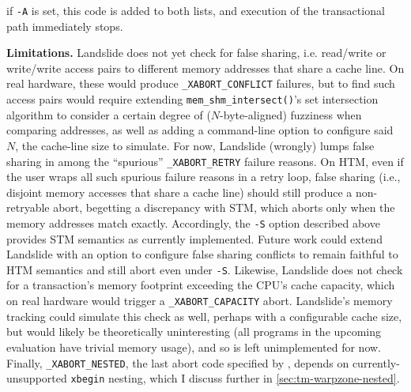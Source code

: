 \begin{itemize}
		if {\tt -A} is set,
		this code is added to both lists,
		and execution of the transactional path immediately stops.
\end{itemize}

{\bf Limitations.}
Landslide does not yet check for false sharing,
i.e. read/write or write/\allowbreak{}write access pairs to different memory addresses that share a cache line.
On real hardware, these would produce {\tt \_XABORT\_CONFLICT} failures,
but to find such access pairs would require extending {\tt mem\_shm\_intersect()}'s set intersection algorithm
to consider a certain degree of ($N$-byte-aligned) fuzziness when comparing addresses,
as well as adding a command-line option to configure said $N$, the cache-line size to simulate.
For now, Landslide (wrongly) lumps false sharing in among the ``spurious'' {\tt \_XABORT\_RETRY} failure reasons.
%
On HTM, even if the user wraps all such spurious failure reasons in a retry loop,
false sharing (i.e., disjoint memory accesses that share a cache line)
should still produce a non-retryable abort,
begetting a discrepancy with STM,
which aborts only when the memory addresses match exactly.
Accordingly, the {\tt -S} option described above provides STM semantics as currently implemented.
Future work could extend Landslide with an option to configure false sharing conflicts
to remain faithful to HTM semantics and still abort even under {\tt -S}.
%
Likewise, Landslide does not check for a transaction's memory footprint exceeding the CPU's cache capacity,
which on real hardware would trigger a {\tt \_XABORT\_CAPACITY} abort.
Landslide's memory tracking could simulate this check as well,
perhaps with a configurable cache size,
but would likely be theoretically uninteresting
(all programs in the upcoming evaluation have trivial memory usage),
and so is left unimplemented for now.
%
Finally,
{\tt \_XABORT\_NESTED},
the last abort code specified by \cite{htm-gcc},
depends on currently-unsupported {\tt xbegin} nesting, which I discuss further in
\cref{sec:tm-warpzone-nested}.


